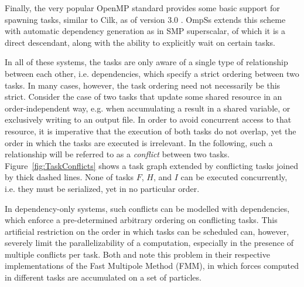 \documentclass[preprint]{elsarticle}
\newcommand{\fig}[1]
    {Figure~\ref{fig:#1}}
\begin{document}
Finally, the very popular OpenMP standard provides some basic support
for spawning tasks, similar to Cilk, as of version 3.0
\cite{ref:OpenMP2008}.
OmpSs \cite{ref:Duran2011} extends this scheme with automatic
dependency generation as in SMP superscalar, of which it
is a direct descendant, along with
the ability to explicitly wait on certain tasks.

In all of these systems, the tasks are only aware of a single
type of relationship between each other, i.e. dependencies, which
specify a strict ordering between two tasks.
In many cases, however, the task ordering need not necessarily
be this strict.
Consider the case of two tasks that update some shared resource
in an order-independent way, e.g. when accumulating a result in
a shared variable, or exclusively writing to an output file.
In order to avoid concurrent access to that resource, it is
imperative that the execution of both tasks do not overlap,
yet the order in which the tasks are executed is irrelevant.
In the following, such a relationship will be referred to
as a {\em conflict} between two tasks.
\fig{TaskConflicts} shows a task graph extended by conflicting tasks
joined by thick dashed lines.
None of tasks $F$, $H$, and $I$ can be executed concurrently,
i.e. they must be serialized, yet in no particular order.

In dependency-only systems, such conflicts can be modelled
with dependencies, which enforce a pre-determined arbitrary
ordering on conflicting tasks.
This artificial restriction on the order
in which tasks can be scheduled can, however, severely limit the
parallelizability of a computation, especially in the presence
of multiple conflicts per task.
Both \cite{ref:Ltaief2012} and \cite{ref:Agullo2013} note
this problem in their respective implementations of the Fast Multipole
Method (FMM), in which forces computed in different tasks are
accumulated on a set of particles.
\end{document}
